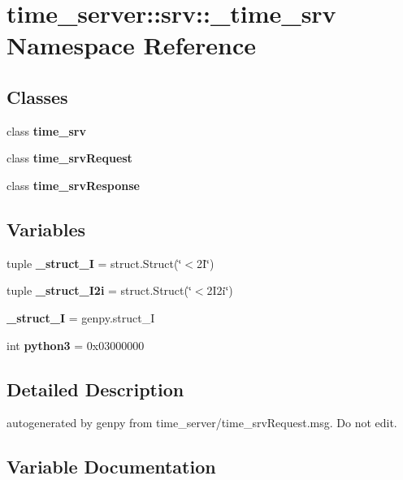 \section{time\-\_\-server\-:\-:srv\-:\-:\-\_\-time\-\_\-srv \-Namespace \-Reference}
\label{namespacetime__server_1_1srv_1_1__time__srv}
\subsection*{\-Classes}
\begin{DoxyCompactItemize}
\item 
class {\bf time\-\_\-srv}
\item 
class {\bf time\-\_\-srv\-Request}
\item 
class {\bf time\-\_\-srv\-Response}
\end{DoxyCompactItemize}
\subsection*{\-Variables}
\begin{DoxyCompactItemize}
\item 
tuple {\bf \-\_\-struct\-\_\-I} = struct.\-Struct(\char`\"{}$<$2\-I\char`\"{})
\item 
tuple {\bf \-\_\-struct\-\_\-I2i} = struct.\-Struct(\char`\"{}$<$2\-I2i\char`\"{})
\item 
{\bf \-\_\-struct\-\_\-\-I} = genpy.\-struct\-\_\-\-I
\item 
int {\bf python3} = 0x03000000
\end{DoxyCompactItemize}


\subsection{\-Detailed \-Description}
\begin{DoxyVerb}autogenerated by genpy from time_server/time_srvRequest.msg. Do not edit.\end{DoxyVerb}
 

\subsection{\-Variable \-Documentation}
